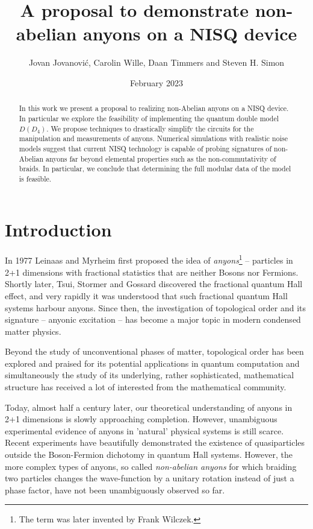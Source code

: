 \documentclass[two column]{article}
\title{A proposal to demonstrate non-abelian anyons on a NISQ device}
\author{Jovan Jovanovi\'c, Carolin Wille, Daan Timmers and Steven H. Simon}
\date{February 2023}
\begin{document}
\maketitle
\begin{abstract}
In this work we present a proposal to realizing non-Abelian anyons on a NISQ device. In particular we explore the feasibility of implementing the quantum double model $D(D_4)$. We propose techniques to drastically simplify the circuits for the manipulation and measurements of anyons. Numerical simulations with realistic noise models suggest that current NISQ technology is capable of probing signatures of non-Abelian anyons far beyond elemental properties such as the non-commutativity of braids. In particular, we conclude that determining the full modular data of the model is feasible.   
\end{abstract}
\tableofcontents



\section{Introduction}

In 1977 Leinaas and Myrheim\cite{Leinaas1977OnTT} 
first proposed the idea of \emph{anyons}\footnote{The term was later invented by Frank Wilczek\cite{Wilczek}.} -- particles in 2+1 dimensions with fractional statistics that are neither Bosons nor Fermions. Shortly later, Tsui, Stormer and Gossard\cite{Tsui} discovered the fractional quantum Hall effect, and very rapidly \cite{Halperin84,Arovas84} it was understood that such fractional quantum Hall systems harbour anyons. Since then, the investigation of topological order and its signature -- anyonic excitation -- has become a major topic in modern condensed matter physics.


Beyond the study of unconventional phases of matter, topological order has been explored and praised for its potential applications in quantum computation\cite{Nayak} and simultaneously the study of its underlying, rather sophisticated, mathematical structure\cite{Kitaev2006} has received a lot of interested from the mathematical community. 


Today, almost half a century later, our theoretical understanding of anyons in 2+1 dimensions is slowly approaching completion. However, unambiguous experimental evidence of anyons in 'natural' physical systems is still scarce. Recent experiments have beautifully demonstrated the existence of quasiparticles outside the Boson-Fermion dichotomy in quantum Hall systems\cite{Nakamura_2020,Bartolomei}. However, the more complex types of anyons, so called \emph{non-abelian anyons} for which  braiding two particles changes the wave-function by a unitary rotation instead of just a phase factor, have not been unambiguously observed so far.
\end{document}
